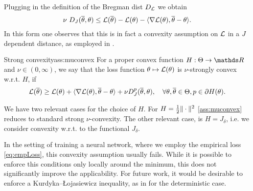 %
Plugging in the definition of the Bregman dist $D_{\mathcal{L}}$ we obtain
%
\begin{align*}
\nu\ D_J(\overline\theta,\theta) \leq \mathcal{L}(\overline\theta) - \mathcal{L}(\theta) - 
\langle \nabla\mathcal{L}(\theta), \overline\theta-\theta\rangle.
\end{align*}
%
In this form one observes that this is in fact a convexity assumption on $\mathcal{L}$ in a $J$ dependent distance, as employed in \cite{bungert2022bregman}.
%
%
\begin{assumption}{Strong convexity}{ass:muconvex} 
For a proper convex function $H:\Param\to\R$ and $\nu\in(0,\infty)$, we say that the loss function $\theta\mapsto\mathcal{L}(\theta)$ is $\nu$-strongly convex w.r.t. $H$, if
\begin{align}
\mathcal{L}(\overline\theta) \geq \mathcal{L}(\theta) + \langle\nabla\mathcal{L}(\theta), \overline\theta - \theta\rangle + \nu D_J^p(\overline\theta,\theta),\quad\forall\theta,\overline\theta\in\Theta, p\in\partial H(\theta).
\end{align}
\end{assumption}
%
%
\begin{remark}{}{}
We have two relevant cases for the choice of $H$. For $H=\frac{1}{2}\|\cdot\|^2$ \cref{ass:muconvex} reduces to standard strong $\nu$-convexity. The other relevant case, is $H=J_\delta$, i.e. we consider convexity w.r.t. to the functional $J_\delta$.
\end{remark}
%
%
\begin{remark}{}{}
In the setting of training a neural network, where we employ the empirical loss \cref{eq:empLoss}, this convexity assumption usually fails. While it is possible to enforce this conditions only locally around the minimum, this does not significantly improve the applicability. For future work, it would be desirable to enforce a  Kurdyka--\L ojasiewicz inequality, as in \cite{benning2018choose} for the deterministic case. 
\end{remark}

